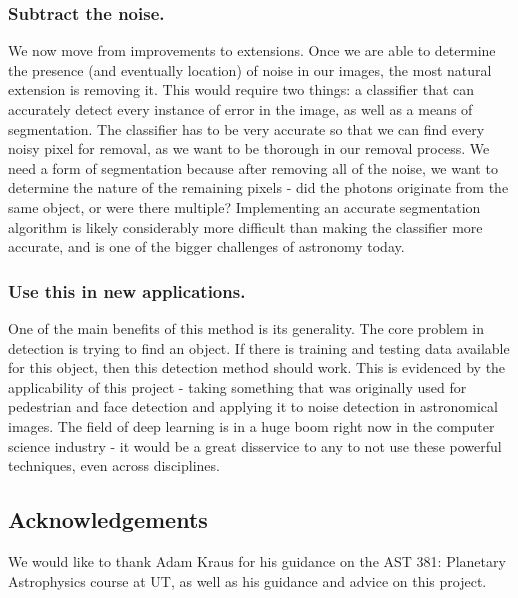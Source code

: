 \documentclass[twocolumn,longauthor]{aastex61}
\begin{document}
\subsubsection{Subtract the noise.} \label{subsubsec:subtract}
\noindent We now move from improvements to extensions. Once we are able to determine the presence (and eventually location) of noise in our images, the most natural extension is removing it. This would require two things: a classifier that can accurately detect every instance of error in the image, as well as a means of segmentation. The classifier has to be very accurate so that we can find every noisy pixel for removal, as we want to be thorough in our removal process. We need a form of segmentation because after removing all of the noise, we want to determine the nature of the remaining pixels - did the photons originate from the same object, or were there multiple? Implementing an accurate segmentation algorithm is likely considerably more difficult than making the classifier more accurate, and is one of the bigger challenges of astronomy today.

\subsubsection{Use this in new applications.} \label{subsubsec:applications}
\noindent One of the main benefits of this method is its generality. The core problem in detection is trying to find an object. If there is training and testing data available for this object, then this detection method should work. This is evidenced by the applicability of this project - taking something that was originally used for pedestrian and face detection and applying it to noise detection in astronomical images. The field of deep learning is in a huge boom right now in the computer science industry - it would be a great disservice to any to not use these powerful techniques, even across disciplines.


\subsection{Acknowledgements} \label{subsec:acknowledgements}
\noindent We would like to thank Adam Kraus for his guidance on the AST 381: Planetary Astrophysics course at UT, as well as his guidance and advice on this project.
\end{document}
